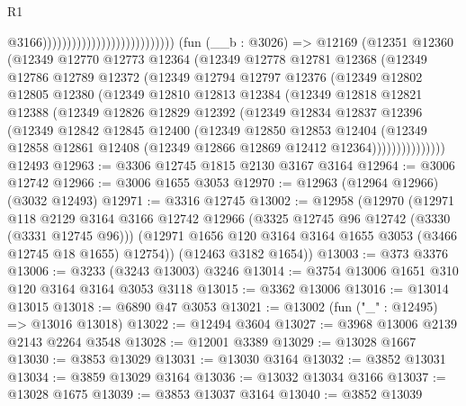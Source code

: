 \begin{lexlean}{R1}
\begin{coremodule}
                                                          @3166)))))))))))))))))))))))))))
    (fun (__b : @3026) =>
    @12169
      (@12351
        @12360
        (@12349
          @12770
          @12773
          @12364
          (@12349
            @12778
            @12781
            @12368
            (@12349
              @12786
              @12789
              @12372
              (@12349
                @12794
                @12797
                @12376
                (@12349
                  @12802
                  @12805
                  @12380
                  (@12349
                    @12810
                    @12813
                    @12384
                    (@12349
                      @12818
                      @12821
                      @12388
                      (@12349
                        @12826
                        @12829
                        @12392
                        (@12349
                          @12834
                          @12837
                          @12396
                          (@12349
                            @12842
                            @12845
                            @12400
                            (@12349
                              @12850
                              @12853
                              @12404
                              (@12349
                                @12858
                                @12861
                                @12408
                                (@12349 @12866 @12869 @12412 @12364)))))))))))))))
    @12493
@12963 := @3306 @12745 @1815 @2130 @3167 @3164
@12964 := @3006 @12742
@12966 := @3006 @1655 @3053
@12970 := @12963 (@12964 @12966) (@3032 @12493)
@12971 := @3316 @12745
@13002 := @12958
    (@12970
      (@12971
        @118
        @2129
        @3164
        @3166
        @12742
        @12966
        (@3325 @12745 @96 @12742 (@3330 (@3331 @12745 @96)))
        (@12971 @1656 @120 @3164 @3164 @1655 @3053 (@3466 @12745 @18 @1655) @12754))
      (@12463 @3182 @1654))
@13003 := @373 @3376
@13006 := @3233 (@3243 @13003) @3246
@13014 := @3754 @13006 @1651 @310 @120 @3164 @3164 @3053 @3118
@13015 := @3362 @13006
@13016 := @13014 @13015
@13018 := @6890 @47 @3053
@13021 := @13002 (fun ("_" : @12495) => @13016 @13018)
@13022 := @12494 @3604
@13027 := @3968 @13006 @2139 @2143 @2264 @3548
@13028 := @12001 @3389
@13029 := @13028 @1667
@13030 := @3853 @13029
@13031 := @13030 @3164
@13032 := @3852 @13031
@13034 := @3859 @13029 @3164
@13036 := @13032 @13034 @3166
@13037 := @13028 @1675
@13039 := @3853 @13037 @3164
@13040 := @3852 @13039

\end{coremodule}
\end{lexlean}
